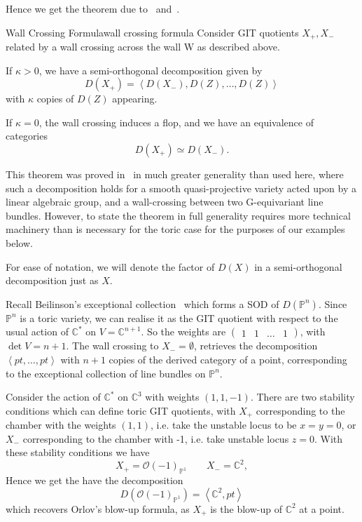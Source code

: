 Hence we get the theorem due to~\cite*{halpernleistner2014derived} and~\cite*{ballard2014variation}.

\begin{theorem}{Wall Crossing Formula}{wall crossing formula}
Consider GIT quotients $X_{+},X_{-}$  related by a wall crossing across the wall W as described above. 

If $\kappa > 0$, we have a semi-orthogonal decomposition given by $$D(X_{+}) = \left< D(X_{-}),D(Z) , \dots, D(Z)  \right>$$with $\kappa$ copies of $D(Z)$ appearing.

If $\kappa = 0$, the wall crossing induces a flop, and we have an equivalence of categories $$D(X_{+})\simeq D(X_-).$$
\end{theorem}

This theorem was proved in~\cite*{ballard2014variation} in much greater generality than used here, where such a decomposition holds for a smooth quasi-projective variety acted upon by a linear algebraic group, and a wall-crossing between two G-equivariant line bundles. However, to state the theorem in full generality requires more technical machinery than is necessary for the toric case for the purposes of our examples below. 

For ease of notation, we will denote the factor of $D(X)$ in a semi-orthogonal decomposition just as $X$. 

\begin{example}{}{}
    Recall Beilinson's exceptional collection~\cite*{Beilinson1978} which forms a SOD of $D(\mathbb{P}^n)$. Since $\mathbb{P}^n$ is a toric variety, we can realise it as the GIT quotient with respect to the usual action of $\mathbb{C}^*$ on $V = \mathbb{C}^{n+1}$. So the weights are $\begin{pmatrix}1 & 1 &\dots &1\end{pmatrix}$, with $\det V = n+1$. The wall crossing to $X_{-}=\emptyset$, retrieves the decomposition $\left< pt, \dots,pt \right>$ with $n+1$ copies of the derived category of a point, corresponding to the exceptional collection of line bundles on $\mathbb{P}^n$. 
\end{example}

\begin{example}{}{}
    Consider the action of $\mathbb{C}^{*}$ on $\mathbb{C}^3$ with weights $(1,1,-1)$. There are two stability conditions which can define toric GIT quotients, with $X_+$ corresponding to the chamber with the weights $(1,1)$, i.e. take the unstable locus to be $x=y= 0$, or $X_-$ corresponding to the chamber with -1, i.e. take unstable locus $z = 0$. With these stability conditions we have $$X_{+}= \mathcal{O}(-1)_{\mathbb{P}^{1}} \qquad X_{-}= \mathbb{C}^2, $$ Hence we get the have the decomposition $$D(\mathcal{O}(-1)_{\mathbb{P}^{1}})= \left< \mathbb{C}^{2}, pt \right> $$ which recovers Orlov's blow-up formula, as $X_+$ is the blow-up of $\mathbb{C}^2$ at a point.
\end{example}

